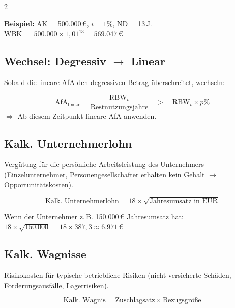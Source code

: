 \documentclass[10pt,a4paper]{article}
\begin{document}
\begin{multicols}{2}
\vspace{4pt}
\begin{hinweisbox}
\textbf{Beispiel:} AK = 500.000\,€, $i=1\%$, ND = 13\,J.\\
WBK $= 500.000 \times 1{,}01^{13} = 569.047$\,€
\end{hinweisbox}

\subsection{Wechsel: Degressiv $\to$ Linear}

Sobald die lineare AfA den degressiven Betrag überschreitet, wechseln:

\begin{formelbox}
\[
\text{AfA}_{\text{linear}} = \frac{\text{RBW}_t}{\text{Restnutzungsjahre}} \quad > \quad \text{RBW}_t \times p\%
\]
$\Rightarrow$ Ab diesem Zeitpunkt lineare AfA anwenden.
\end{formelbox}

\subsection{Kalk. Unternehmerlohn}

Vergütung für die persönliche Arbeitsleistung des Unternehmers (Einzelunternehmer, Personengesellschafter erhalten kein Gehalt $\to$ Opportunitätskosten).

\begin{formelbox}
\[
\text{Kalk. Unternehmerlohn} = 18 \times \sqrt{\text{Jahresumsatz in EUR}}
\]
\end{formelbox}

\begin{hinweisbox}
Wenn der Unternehmer z.\,B. 150.000\,€ Jahresumsatz hat:\\
$18 \times \sqrt{150.000} = 18 \times 387{,}3 \approx 6.971$\,€
\end{hinweisbox}

\subsection{Kalk. Wagnisse}

Risikokosten für typische betriebliche Risiken (nicht versicherte Schäden, Forderungsausfälle, Lagerrisiken).

\begin{formelbox}
\[
\text{Kalk. Wagnis} = \text{Zuschlagsatz} \times \text{Bezugsgröße}
\]
\end{formelbox}


\end{multicols}
\end{document}
